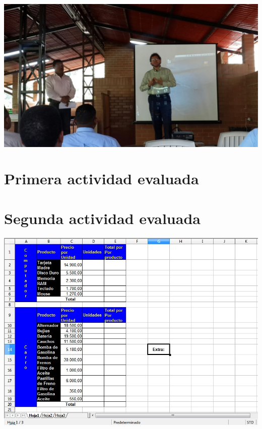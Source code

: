 \includegraphics[scale=0.3]{./Anexos/img/13.jpg}\\
\pagebreak

\section*{Primera actividad evaluada}

\pagebreak

\section*{Segunda actividad evaluada}

\includegraphics[scale=.75]{./Anexos/img/e2.png}

\pagebreak


